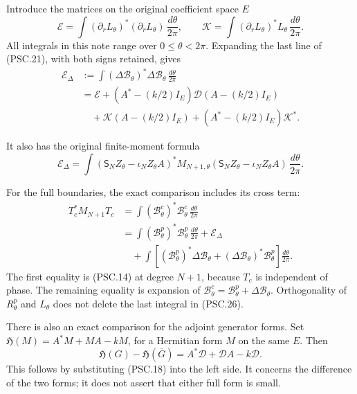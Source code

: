 Introduce the matrices on the original coefficient space \(E\)
\[
 \mathscr E
 =\int(\partial_rL_\theta)^*(\partial_rL_\theta)
       \,\frac{d\theta}{2\pi},\qquad
 \mathscr K
 =\int(\partial_rL_\theta)^*L_\theta
       \,\frac{d\theta}{2\pi}.
 \tag{PSC.23}
\]
All integrals in this note range over \(0\leq\theta<2\pi\).
Expanding the last line of (PSC.21), with both signs retained, gives
\[
 \begin{aligned}
 \mathscr E_\Delta
 &:=\int(\Delta\mathscr B_\theta)^*
             \Delta\mathscr B_\theta\,\frac{d\theta}{2\pi}\\
 &=\mathscr E+
   (A^*-(k/2)I_E)\mathscr D(A-(k/2)I_E)\\
 &\quad+\mathscr K(A-(k/2)I_E)
       +(A^*-(k/2)I_E)\mathscr K^* .
 \end{aligned}
 \tag{PSC.24}
\]

It also has the original finite-moment formula
\[
 \mathscr E_\Delta
 =\int
  (\mathsf S_NZ_\theta-\iota_NZ_\theta A)^*
  M_{N+1,\theta}
  (\mathsf S_NZ_\theta-\iota_NZ_\theta A)
  \,\frac{d\theta}{2\pi}.
 \tag{PSC.25}
\]

For the full boundaries, the exact comparison includes its cross term:
\[
 \begin{aligned}
 T_c^*M_{N+1}T_c
 &=\int(\mathscr B^c_\theta)^*\mathscr B^c_\theta
             \,\frac{d\theta}{2\pi}\\
 &=\int(\mathscr B^p_\theta)^*\mathscr B^p_\theta
             \,\frac{d\theta}{2\pi}
   +\mathscr E_\Delta\\
 &\quad+\int\left[
       (\mathscr B^p_\theta)^*\Delta\mathscr B_\theta
       +(\Delta\mathscr B_\theta)^*\mathscr B^p_\theta
      \right]\frac{d\theta}{2\pi}.
 \end{aligned}
 \tag{PSC.26}
\]
The first equality is (PSC.14) at degree \(N+1\), because \(T_c\) is independent of phase. The remaining equality is expansion of
\(\mathscr B^c_\theta=\mathscr B^p_\theta+\Delta\mathscr B_\theta\).
Orthogonality of \(R^p_\theta\) and \(L_\theta\) does not delete the last integral in (PSC.26).

There is also an exact comparison for the adjoint generator forms. Set
\(\mathfrak H(M)=A^*M+MA-kM\), for a Hermitian form \(M\) on the same \(E\). Then
\[
 \boxed{
 \mathfrak H(G)-\mathfrak H(\overline G)
 =A^*\mathscr D+\mathscr DA-k\mathscr D.}
 \tag{PSC.27}
\]
This follows by substituting (PSC.18) into the left side. It concerns the difference of the two forms; it does not assert that either full form is small.

